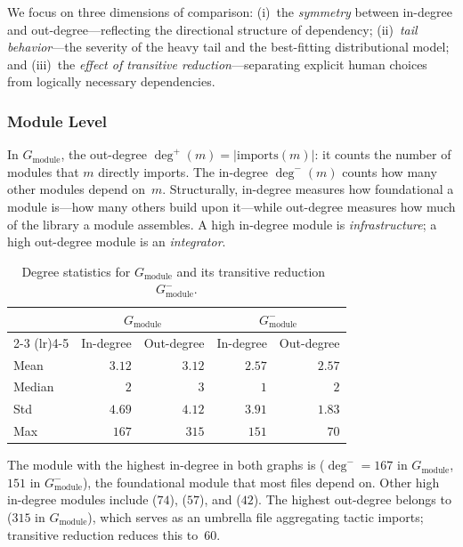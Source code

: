 We focus on three dimensions of comparison: (i)~the \emph{symmetry} between in-degree and out-degree---reflecting the directional structure of dependency; (ii)~\emph{tail behavior}---the severity of the heavy tail and the best-fitting distributional model; and (iii)~the \emph{effect of transitive reduction}---separating explicit human choices from logically necessary dependencies.

\subsubsection{Module Level}
\label{sec:degree-distribution}

In $G_{\mathrm{module}}$, the out-degree $\deg^{+}(m) = |\mathrm{imports}(m)|$: it counts the number of modules that $m$ directly imports. The in-degree $\deg^{-}(m)$ counts how many other modules depend on~$m$.
Structurally, in-degree measures how foundational a module is---how many others build upon it---while out-degree measures how much of the library a module assembles. A high in-degree module is \emph{infrastructure}; a high out-degree module is an \emph{integrator}.

\begin{table}[H]
\centering
\caption{Degree statistics for $G_{\mathrm{module}}$ and its transitive reduction~$G_{\mathrm{module}}^{-}$.}
\label{tab:degree-stats}
\begin{tabular}{lrrrr}
\toprule
& \multicolumn{2}{c}{$G_{\mathrm{module}}$} & \multicolumn{2}{c}{$G_{\mathrm{module}}^{-}$} \\
\cmidrule(lr){2-3} \cmidrule(lr){4-5}
& In-degree & Out-degree & In-degree & Out-degree \\
\midrule
Mean   & $3.12$ & $3.12$ & $2.57$ & $2.57$ \\
Median & $2$    & $3$    & $1$    & $2$    \\
Std    & $4.69$ & $4.12$ & $3.91$ & $1.83$ \\
Max    & $167$  & $315$  & $151$  & $70$   \\
\bottomrule
\end{tabular}
\end{table}

The module with the highest in-degree in both graphs is  ($\deg^{-} = 167$ in $G_{\mathrm{module}}$, $151$ in $G_{\mathrm{module}}^{-}$), the foundational module that most files depend on. Other high in-degree modules include  ($74$),  ($57$), and  ($42$). The highest out-degree belongs to  ($315$ in $G_{\mathrm{module}}$), which serves as an umbrella file aggregating tactic imports; transitive reduction reduces this to~$60$.

